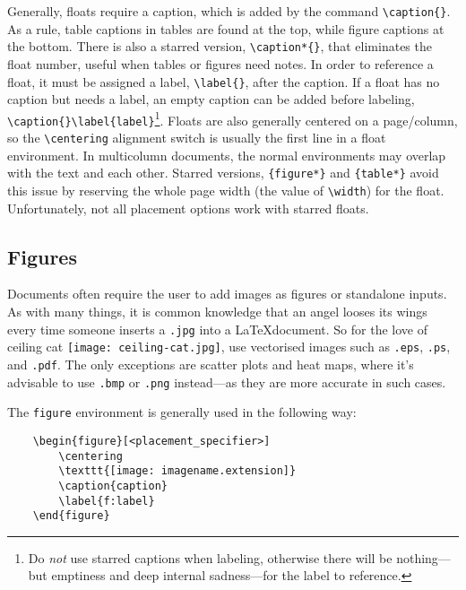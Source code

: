 Generally, floats require a caption, which is added by the command
\verb|\caption{}|.  As a rule, table captions in tables are found at
the top, while figure captions at the bottom.  There is also a starred
version, \verb|\caption*{}|, that eliminates the float number, useful
when tables or figures need notes.  In order to reference a float, it
must be assigned a label, \verb|\label{}|, after the caption.  If a
float has no caption but needs a label, an empty caption can be added
before labeling, \verb|\caption{}\label{label}|\footnote{Do \emph{not}
  use starred captions when labeling, otherwise there will be
  nothing---but emptiness and deep internal sadness---for the label to
  reference.}.  Floats are also generally centered on a page/column,
so the \verb|\centering| alignment switch is usually the first line in
a float environment.  In multicolumn documents, the normal
environments may overlap with the text and each other.  Starred
versions, \verb|{figure*}| and \verb|{table*}| avoid this issue by
reserving the whole page width (the value of \verb|\width|) for the
float.  Unfortunately, not all placement options work with starred
floats.
%
\subsection{Figures}
%
Documents often require the user to add images as figures or
standalone inputs.  As with many things, it is common knowledge that
an angel looses its wings every time someone inserts a \texttt{.jpg}
into a \LaTeX document.  So for the love of ceiling
cat \texttt{[image: ceiling-cat.jpg]}, use vectorised
images such as \texttt{.eps}, \texttt{.ps}, and \texttt{.pdf}.  The
only exceptions are scatter plots and heat maps, where it's advisable
to use \texttt{.bmp} or \texttt{.png} instead---as they are more
accurate in such cases.

The \verb|figure| environment is generally used in the following way:
\begin{verbatim}
	\begin{figure}[<placement_specifier>]
	    \centering
	    \texttt{[image: imagename.extension]}
	    \caption{caption}
	    \label{f:label}
	\end{figure}
\end{verbatim}

